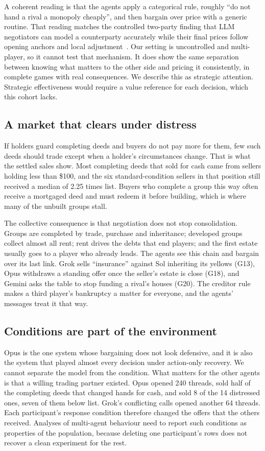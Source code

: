 A coherent reading is that the agents apply a categorical rule, roughly ``do not hand a rival a monopoly cheaply'', and then bargain over price with a generic routine. That reading matches the controlled two-party finding that LLM negotiators can model a counterparty accurately while their final prices follow opening anchors and local adjustment~\cite{cosentino2026counterparty}. Our setting is uncontrolled and multi-player, so it cannot test that mechanism. It does show the same separation between knowing what matters to the other side and pricing it consistently, in complete games with real consequences. We describe this as strategic attention. Strategic effectiveness would require a value reference for each decision, which this cohort lacks.

\subsection{A market that clears under distress}

If holders guard completing deeds and buyers do not pay more for them, few such deeds should trade except when a holder's circumstances change. That is what the settled sales show. Most completing deeds that sold for cash came from sellers holding less than \$100, and the six standard-condition sellers in that position still received a median of 2.25 times list. Buyers who complete a group this way often receive a mortgaged deed and must redeem it before building, which is where many of the unbuilt groups stall.

The collective consequence is that negotiation does not stop consolidation. Groups are completed by trade, purchase and inheritance; developed groups collect almost all rent; rent drives the debts that end players; and the first estate usually goes to a player who already leads. The agents see this chain and bargain over its last link. Grok sells ``insurance'' against Sol inheriting its yellows (G13), Opus withdraws a standing offer once the seller's estate is close (G18), and Gemini asks the table to stop funding a rival's houses (G20). The creditor rule makes a third player's bankruptcy a matter for everyone, and the agents' messages treat it that way.

\subsection{Conditions are part of the environment}

Opus is the one system whose bargaining does not look defensive, and it is also the system that played almost every decision under action-only recovery. We cannot separate the model from the condition. What matters for the other agents is that a willing trading partner existed. Opus opened 240 threads, sold half of the completing deeds that changed hands for cash, and sold 8 of the 14 distressed ones, seven of them below list. Grok's conflicting calls opened another 64 threads. Each participant's response condition therefore changed the offers that the others received. Analyses of multi-agent behaviour need to report such conditions as properties of the population, because deleting one participant's rows does not recover a clean experiment for the rest.

